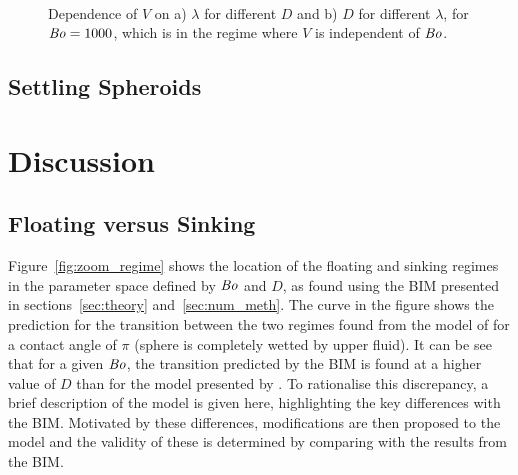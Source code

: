 \documentclass[12pt]{article}
\newcommand\Bo{\mbox{\textit{Bo}}}  %
\begin{document}
    \begin{figure}
      \centering
      \begin{subfigure}[b]{0.45\textwidth}
        \resizebox{\textwidth}{!}{\Large }
        \caption{}
        \label{fig:highBo_viscos}
      \end{subfigure}
      ~
      \begin{subfigure}[b]{0.45\textwidth}
        \resizebox{\textwidth}{!}{\Large }
        \caption{}
        \label{fig:highBo_mdr}
      \end{subfigure}
      \caption{Dependence of $V$ on a) $\lambda$ for different $D$ and b) $D$ for different $\lambda$, for $\Bo = 1000$, which is in the regime where $V$ is independent of $\Bo$.}\label{fig:highBo}
    \end{figure}

\subsection{Settling Spheroids}
\label{subsec:spheroids}


\section{Discussion}
\label{sec:discuss}

\subsection{Floating versus Sinking}
\label{subsec:float_sink_discuss}

Figure~\ref{fig:zoom_regime} shows the location of the floating and sinking regimes in the parameter space defined by $\Bo$ and $D$, as found using the BIM presented in sections~\ref{sec:theory} and~\ref{sec:num_meth}. The curve in the figure shows the prediction for the transition between the two regimes found from the model of \citet{Vella06} for a contact angle of $\pi$ (sphere is completely wetted by upper fluid). It can be see that for a given $\Bo$, the transition predicted by the BIM is found at a higher value of $D$ than for the model presented by \citet{Vella06}. To rationalise this discrepancy, a brief description of the \citet{Vella06} model is given here, highlighting the key differences with the BIM. Motivated by these differences, modifications are then proposed to the \citet{Vella06} model and the validity of these is determined by comparing with the results from the BIM.
\end{document}
